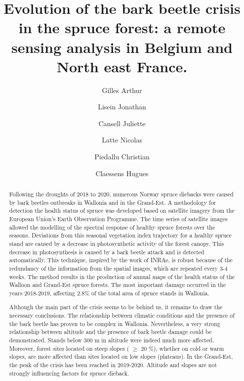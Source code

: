 \documentclass[3p,procedia]{elsarticle}
\begin{document}
\begin{frontmatter}

\author[label1]{Gilles Arthur}
\author[label1]{Lisein Jonathan}
\author[label2]{Cansell Juliette}
\author[label1]{Latte Nicolas}
\author[label3]{Piedallu Christian}
\author[label1]{Claessens Hugues}



\title{Evolution of the bark beetle crisis in the spruce forest: a remote sensing analysis in Belgium and North east France.}
\begin{abstract}
	
\iffalse




Following the droughts of 2018 to 2020, numerous Norway spruce diebacks were caused by bark beetles 
outbreaks in Wallonia and in the Grand-Est. 
A methodology for detection the health status of spruce was developed based on satellite imagery from the European Union's Earth Observation Programme.
The time series of satellite images allowed the modelling of the spectral response of healthy spruce forests over the seasons. Deviations from this seasonal vegetation index trajectory for a healthy spruce stand are caused by a decrease in photosynthetic activity of the forest canopy.
This decrease in photosynthesis is caused by a bark beetle attack and is detected automatically.
This technique, inspired by the work of INRAe, is robust because of the redundancy of the information from the spatial images, which are repeated every 3-4 weeks. 
The method results in the production of annual maps of the health status of the Walloon and Grand-Est spruce forests.
The most important damage occurred in the years 2018-2019, affecting 2.8\% of the total area of spruce stands in Wallonia.

Although the main part of the crisis seems to be behind us, it remains to draw the necessary conclusions.
The relationship between climatic conditions and the presence of the bark beetle has proven to be complex in Wallonia.
Nevertheless, a very strong relationship between altitude and the presence of bark beetle damage could be demonstrated.
Stands below 300 m in altitude were indeed much more affected.
Moreover, forest sites located on steep slopes ( $\ge$  20 \%), whether on cold or warm slopes, are more affected than sites located on low slopes (plateaus).
In the Grand-Est, the peak of the crisis has been reached in 2019-2020. Altitude and slopes are not strongly influencing factors for spruce dieback. 


\end{abstract}
\end{frontmatter}
\end{document}

